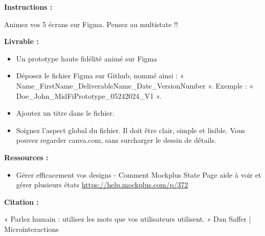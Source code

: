 \makeheaderfiles

\textbf{Instructions :}

Animez vos 5 écrans sur Figma. Pensez au multistate !!

\textbf{Livrable :}

\begin{itemize}
\item Un prototype haute fidélité animé sur Figma
\item Déposez le fichier Figma sur Github, nommé ainsi : « Name\_FirstName\_DeliverableName\_Date\_VersionNumber ». Exemple : « Doe\_John\_MidFiPrototype\_05242024\_V1 ».
\item Ajoutez un titre dans le fichier.
\item Soignez l'aspect global du fichier. Il doit être clair, simple et lisible. Vous pouvez regarder canva.com, sans surcharger le dessin de détails.
\end{itemize}

\textbf{Ressources :}

\begin{itemize}
\item Gérer efficacement vos designs - Comment Mockplus State Page aide à voir et gérer plusieurs états \url{https://help.mockplus.com/p/372}
\end{itemize}

\textbf{Citation :}

« Parlez humain : utilisez les mots que vos utilisateurs utilisent. » Dan Saffer | Microinteractions

